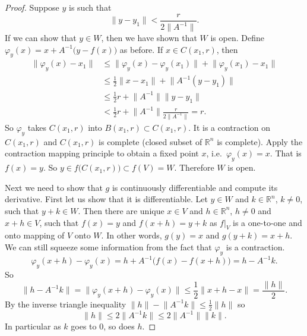 \documentclass[12pt]{book}
\newcommand{\snorm}[1]{\lVert {#1} \rVert}
\newcommand{\R}{{\mathbb{R}}}
\theoremstyle{plain}
\theoremstyle{remark}
\theoremstyle{definition}
\theoremstyle{exercise}
\theoremstyle{example}
\begin{document}
\begin{proof}
Suppose $y$ is such that
\begin{equation*}
\snorm{y-y_1} <
\frac{r}{2\snorm{A^{-1}}} .
\end{equation*}
If we can show that $y \in W$, then we have shown that $W$ is open.
Define $\varphi_y(x) = x+A^{-1}\bigl(y-f(x)\bigr)$ as before.  If $x \in
C(x_1,r)$, then
\begin{equation*}
\begin{split}
\snorm{\varphi_y(x)-x_1}
& \leq
\snorm{\varphi_y(x)-\varphi_y(x_1)} +
\snorm{\varphi_y(x_1)-x_1} \\
& \leq
\frac{1}{2}\snorm{x-x_1} +
\snorm{A^{-1}(y-y_1)} \\
& \leq
\frac{1}{2}r +
\snorm{A^{-1}}\snorm{y-y_1} \\
& <
\frac{1}{2}r +
\snorm{A^{-1}}
\frac{r}{2\snorm{A^{-1}}} = r .
\end{split}
\end{equation*}
So $\varphi_y$ takes $C(x_1,r)$ into $B(x_1,r) \subset C(x_1,r)$.  It is a
contraction on $C(x_1,r)$ and $C(x_1,r)$ is complete (closed subset of $\R^n$
is complete).
Apply the contraction mapping principle to obtain a fixed point $x$,
i.e.\ $\varphi_y(x) = x$.  That is $f(x) = y$.  So $y \in
f\bigl(C(x_1,r)\bigr) \subset f(V) = W$.  Therefore $W$ is open.

Next we need to show that $g$ is continuously differentiable and compute
its derivative.  First let us show that it is differentiable.
Let $y \in W$ and $k \in \R^n$, $k\not= 0$, such that $y+k \in W$.  Then
there are unique
$x \in V$ and $h \in \R^n$, $h \not= 0$ and $x+h \in V$, such that
$f(x) = y$ and $f(x+h) = y+k$ as $f|_V$ is a one-to-one and onto mapping of $V$
onto $W$.  In other words, $g(y) = x$ and $g(y+k) = x+h$.  We can still
squeeze some information from the fact that $\varphi_y$ is a contraction.
\begin{equation*}
\varphi_y(x+h)-\varphi_y(x) = h + A^{-1} \bigl( f(x)-f(x+h) \bigr) = h - A^{-1} k .
\end{equation*}
So
\begin{equation*}
\snorm{h-A^{-1}k} = \snorm{\varphi_y(x+h)-\varphi_y(x)} \leq
\frac{1}{2}\snorm{x+h-x} = \frac{\snorm{h}}{2}.
\end{equation*}
By the inverse triangle inequality $\snorm{h} - \snorm{A^{-1}k} \leq
\frac{1}{2}\snorm{h}$ so
\begin{equation*}
\snorm{h} \leq 2 \snorm{A^{-1}k} \leq 2 \snorm{A^{-1}} \snorm{k}.
\end{equation*}
In particular as $k$ goes to 0, so does $h$.


\end{proof}
\end{document}
